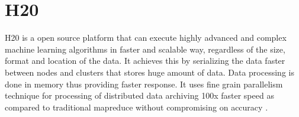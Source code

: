 \section{H20}


H20 is a open source platform that can execute highly advanced and complex machine learning algorithms in faster and scalable way, regardless of the size, format and location of the data\cite{www-h2o}.
It achieves this by serializing the data faster between nodes and clusters that stores huge amount of data. Data processing is done in memory thus providing faster response\cite{www-h2o}.
It uses fine grain parallelism technique for processing of distributed data archiving 100x faster speed as compared to traditional mapreduce without compromising on accuracy \cite{www-h2o}.



